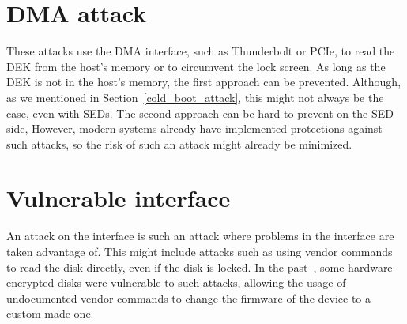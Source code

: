 

\section{DMA attack}

These attacks use the DMA interface, such as Thunderbolt or PCIe, to read the DEK from the host's memory or to circumvent the lock screen. As long as the DEK is not in the host's memory, the first approach can be prevented. Although, as we mentioned in Section~\ref{cold_boot_attack}, this might not always be the case, even with SEDs.
The second approach can be hard to prevent on the SED side, 
However, modern systems already have implemented protections against such attacks, so the risk of such an attack might already be minimized.


\section{Vulnerable interface}

An attack on the interface is such an attack where problems in the interface are taken advantage of.
This might include attacks such as using vendor commands to read the disk directly, even if the disk is locked. In the past~\cite{self_encrypting_deception}, some hardware-encrypted disks were vulnerable to such attacks, allowing the usage of undocumented vendor commands to change the firmware of the device to a custom-made one. %

\REPLACEME

